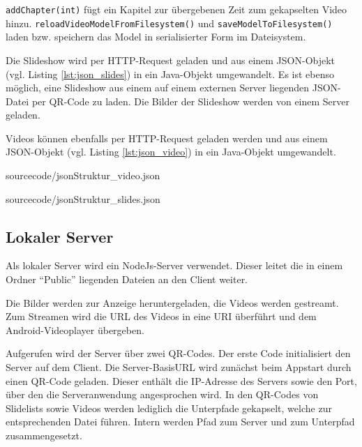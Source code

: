 \texttt{addChapter(int)} fügt ein Kapitel zur übergebenen Zeit zum gekapselten Video hinzu. 
\texttt{reloadVideoModelFromFilesystem()} und \texttt{saveModelToFilesystem()} laden bzw. speichern das Model in serialisierter Form im Dateisystem.

Die Slideshow wird per HTTP-Request geladen und aus einem JSON-Objekt (vgl. Listing \ref{lst:json_slides}) in ein Java-Objekt umgewandelt. Es ist ebenso möglich, eine Slideshow aus einem auf einem externen Server liegenden JSON-Datei per QR-Code zu laden. Die Bilder der Slideshow werden von einem Server geladen.

Videos können ebenfalls per HTTP-Request geladen werden und aus einem JSON-Objekt (vgl. Listing \ref{lst:json_video}) in ein Java-Objekt umgewandelt. 

\begin{minipage}{\linewidth}
\begin{lstinputlisting}[%
    caption={JSON-Struktur des Videos},%
    captionpos=b, %
    label={lst:json_video},%
    language=json,%
    firstnumber=1, %
    basicstyle=\scriptsize, %
    breaklines=true]
{sourcecode/jsonStruktur_video.json}
\end{lstinputlisting}
\end{minipage}
%
\begin{minipage}{\linewidth}
\begin{lstinputlisting}[%
    caption={JSON-Struktur der Slides},%
    captionpos=b, %
    label={lst:json_slides},%
    language=json,%
    firstnumber=1, %
    basicstyle=\scriptsize, %
    breaklines=true]
{sourcecode/jsonStruktur_slides.json}
\end{lstinputlisting}
\end{minipage}
%
%
\subsection{Lokaler Server}
\label{sec:Lokaler_Server}
Als lokaler Server wird ein NodeJs-Server verwendet. Dieser leitet die in einem Ordner \enquote{Public} liegenden Dateien an den Client weiter. 

Die Bilder werden zur Anzeige heruntergeladen, die Videos werden gestreamt. Zum Streamen wird die URL des Videos in eine URI überführt und dem Android-Videoplayer übergeben.

Aufgerufen wird der Server über zwei QR-Codes. Der erste Code initialisiert den Server auf dem Client. Die Server-BasisURL wird zunächst beim Appstart durch einen QR-Code geladen. Dieser enthält die IP-Adresse des Servers sowie den Port, über den die Serveranwendung angesprochen wird. In den QR-Codes von Slidelists sowie Videos werden lediglich die Unterpfade gekapselt, welche zur entsprechenden Datei führen. Intern werden Pfad zum Server und zum Unterpfad zusammengesetzt.
%
